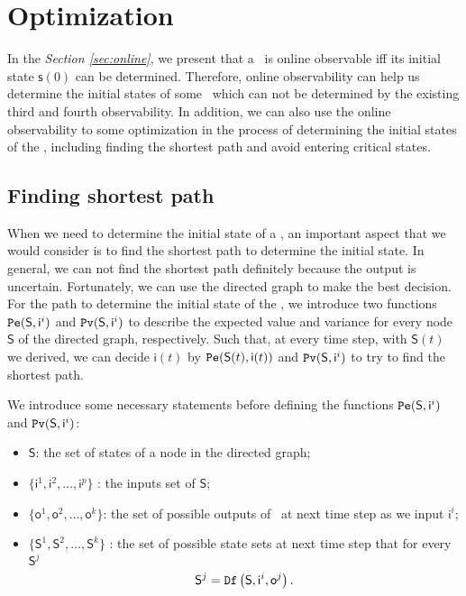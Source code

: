 \section{Optimization}
\label{sec:app}

In the {\em Section \ref{sec:online}}, we present that a  \BCN\ is online observable iff its initial state $\mathsf{s}(0)$ can be determined. Therefore, online observability can help us determine the initial states of some \BCNs\ which can not be determined by the existing third and fourth observability. In addition, we can also use the online observability to some optimization in the process of determining the initial states of the \BCNs, including finding the shortest path and avoid entering critical states. 

\subsection{Finding shortest path}
When we need to determine the initial state of a \BCN, an important aspect that we would consider is to find the shortest path to determine the initial state. In general, we can not find the shortest path definitely because the output is uncertain. Fortunately, we can use the directed graph to make the best decision. For the path to determine the initial state of the \BCNs, we introduce two functions ${\tt Pe}(\mathsf{S},\mathsf{ i}^{i})$ and ${\tt Pv}(\mathsf{S},\mathsf{ i}^{i})$ to describe the expected value and variance for every node $\mathsf{S}$ of the directed graph, respectively. Such that, at every time step, with $\mathsf{S}(t)$ we derived, we can decide $\mathsf{i}(t)$ by ${\tt Pe}(\mathsf{S}(t),\mathsf{ i}(t))$ and ${\tt Pv}(\mathsf{S},\mathsf{ i}^{i})$ to try to find the shortest path. 

We introduce some necessary statements before defining the functions ${\tt Pe}(\mathsf{S},\mathsf{ i}^{i})$ and ${\tt Pv}(\mathsf{S},\mathsf{ i}^{i})$:
\begin{itemize}
  \item $\mathsf{S}$: the set of states of a node in the directed graph;
  \item $\{\mathsf{ i}^{1},\mathsf{ i}^{2},\ldots, \mathsf{ i}^{p}\}$ : the inputs set of $\mathsf{S}$;
  \item $\{\mathsf{o}^1,\mathsf{o}^2,\ldots,\mathsf{o}^k\}$: the set of possible outputs of \BCN\ at next time step as we input $\mathsf{ i}^{i}$;
 \item $\{\mathsf{S}^{1},\mathsf{S}^{2},\ldots, \mathsf{S}^{k}\}$ : the set of possible state sets at next time step that for every $\mathsf{S}^{j}$ \[\mathsf{S}^{j}={\tt Df}\left(\mathsf{S},\mathsf{i}^{i},\mathsf{o}^{j}\right).\] 
  
\end{itemize} 

